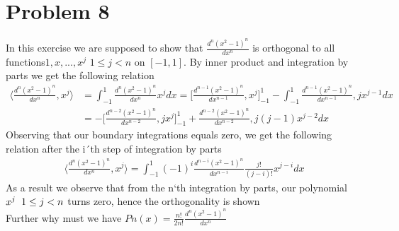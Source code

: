 \documentclass[a4paper,norsk]{article}
\begin{document}
\section*{Problem 8}
In this exercise we are supposed to show that $\frac{d^n(x^2 -1 )^n}{dx^n}$ is orthogonal to all functions$1, x, ...,x^{j}$ $1 \leq j < n$
on $[-1, 1]$. By inner product and integration by parts we get the following relation
\begin{align*}
\langle \frac{d^n(x^2 -1 )^n}{dx^n}, x^{j}\rangle &= \int_{-1}^{1} \frac{d^n(x^2 -1 )^n}{dx^n} x^{j} dx = 
\Big[\frac{d^{n-1}(x^2 -1 )^n}{dx^{n-1}}, x^{j} \Big]_{-1}^{1} - \int_{-1}^{1} \frac{d^{n-1}(x^2 -1 )^n}{dx^{n-1}}, jx^{j-1} dx \\
&= - \Big[\frac{d^{n-2}(x^2 -1 )^n}{dx^{n-2}}, jx^{j} \Big]_{-1}^{1} + \frac{d^{n-2}(x^2 -1 )^n}{dx^{n-2}}, j(j-1)x^{j-2} dx
\end{align*}
Observing that our boundary integrations equals zero, we get the following relation after the i´th step of integration by parts
\begin{align*}
\langle \frac{d^n(x^2 -1 )^n}{dx^n}, x^{j}\rangle = \int_{-1}^1(-1)^i\frac{d^{n-i}(x^2 -1 )^n}{dx^{n-i}} \frac{j!}{(j-i)!} x^{j-i} dx
\end{align*}
As a result we observe that from the n`th integration by parts, our polynomial $x^{j} \hspace{2mm} 1 \leq j < n$ turns zero, hence the orthogonality is shown \\
Further why must we have  $Pn(x) = \frac{n!}{2n!} \frac{d^n(x^2-1)^n}{dx^n}$ \\
\end{document}
